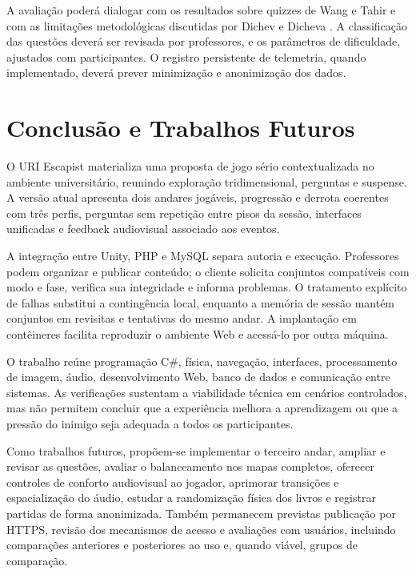 \documentclass[12pt]{article}
\begin{document}
A avaliação poderá dialogar com os resultados sobre quizzes de Wang e Tahir \cite{wang2020} e com as limitações metodológicas discutidas por Dichev e Dicheva \cite{dichev2017}. A classificação das questões deverá ser revisada por professores, e os parâmetros de dificuldade, ajustados com participantes. O registro persistente de telemetria, quando implementado, deverá prever minimização e anonimização dos dados.

\section{Conclusão e Trabalhos Futuros}

O URI Escapist materializa uma proposta de jogo sério contextualizada no ambiente universitário, reunindo exploração tridimensional, perguntas e suspense. A versão atual apresenta dois andares jogáveis, progressão e derrota coerentes com três perfis, perguntas sem repetição entre pisos da sessão, interfaces unificadas e feedback audiovisual associado aos eventos.

A integração entre Unity, PHP e MySQL separa autoria e execução. Professores podem organizar e publicar conteúdo; o cliente solicita conjuntos compatíveis com modo e fase, verifica sua integridade e informa problemas. O tratamento explícito de falhas substitui a contingência local, enquanto a memória de sessão mantém conjuntos em revisitas e tentativas do mesmo andar. A implantação em contêineres facilita reproduzir o ambiente Web e acessá-lo por outra máquina.

O trabalho reúne programação C\#, física, navegação, interfaces, processamento de imagem, áudio, desenvolvimento Web, banco de dados e comunicação entre sistemas. As verificações sustentam a viabilidade técnica em cenários controlados, mas não permitem concluir que a experiência melhora a aprendizagem ou que a pressão do inimigo seja adequada a todos os participantes.

Como trabalhos futuros, propõem-se implementar o terceiro andar, ampliar e revisar as questões, avaliar o balanceamento nos mapas completos, oferecer controles de conforto audiovisual ao jogador, aprimorar transições e espacialização do áudio, estudar a randomização física dos livros e registrar partidas de forma anonimizada. Também permanecem previstas publicação por HTTPS, revisão dos mecanismos de acesso e avaliações com usuários, incluindo comparações anteriores e posteriores ao uso e, quando viável, grupos de comparação.



\end{document}
